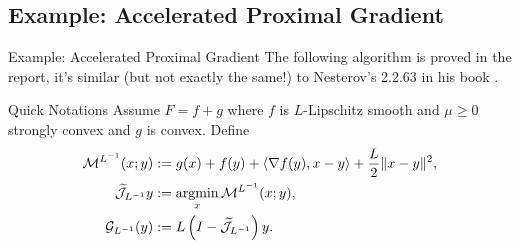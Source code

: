 \documentclass[11pt]{beamer}
\begin{document}
    \subsection{Example: Accelerated Proximal Gradient}
        \begin{frame}{Example: Accelerated Proximal Gradient}
            The following algorithm is proved in the report, it's similar (but not exactly the same!) to Nesterov's 2.2.63 in his book \cite{nesterov_lectures_2018}. 
            \begin{block}{Quick Notations}
                Assume $F = f + g$ where $f$ is $L$-Lipschitz smooth and $\mu \ge 0$ strongly convex and $g$ is convex. 
                Define
                \begin{align*}
                    \mathcal M^{L^{-1}}(x; y) 
                    &:= g(x) + f(y) 
                    + 
                    \left\langle \nabla f(y), x - y\right\rangle 
                    + 
                    \frac{L}{2}\Vert x - y\Vert^2, 
                    \\
                    \widetilde{\mathcal J}_{L^{-1}}y 
                    &:= \mathop{\rm argmin}\limits_{x} \mathcal M^{L^{-1}}(x; y), 
                    \\
                    \mathcal G_{L^{-1}}(y)
                    &:= L\left(I - \widetilde{\mathcal J}_{L^{-1}}\right)y. 
                \end{align*}
            \end{block}
        \end{frame}
\end{document}
